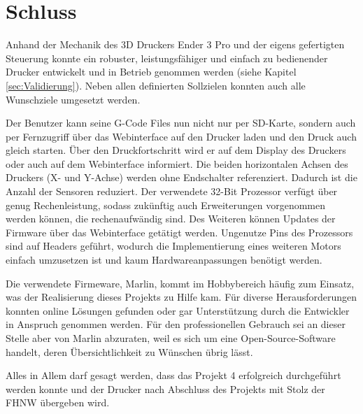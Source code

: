 \section{Schluss}
\label{sec:Schluss}

Anhand der Mechanik des 3D Druckers Ender 3 Pro und der eigens gefertigten Steuerung konnte ein robuster, leistungsfähiger und einfach zu bedienender Drucker entwickelt und in Betrieb genommen werden (siehe Kapitel \ref{sec:Validierung}). Neben allen definierten Sollzielen konnten auch alle Wunschziele umgesetzt werden.

Der Benutzer kann seine G-Code Files nun nicht nur per SD-Karte, sondern auch per Fernzugriff über das Webinterface auf den Drucker laden und den Druck auch gleich starten. Über den Druckfortschritt wird er auf dem Display des Druckers oder auch auf dem Webinterface informiert. Die beiden horizontalen Achsen des Druckers (X- und Y-Achse) werden ohne Endschalter referenziert. Dadurch ist die Anzahl der  Sensoren reduziert.
Der verwendete 32-Bit Prozessor verfügt über genug Rechenleistung, sodass zukünftig auch Erweiterungen vorgenommen werden können, die rechenaufwändig sind. Des Weiteren können Updates der Firmware über das Webinterface getätigt werden. Ungenutze Pins des Prozessors sind auf Headers geführt, wodurch die Implementierung eines weiteren Motors einfach umzusetzen ist und kaum Hardwareanpassungen benötigt werden.

Die verwendete Firmeware, Marlin, kommt im Hobbybereich häufig zum Einsatz, was der Realisierung dieses Projekts zu Hilfe kam. Für diverse Herausforderungen konnten online Lösungen gefunden  oder gar Unterstützung durch die Entwickler in Anspruch genommen werden. Für den professionellen Gebrauch sei an dieser Stelle aber von Marlin abzuraten, weil es sich um eine Open-Source-Software handelt, deren Übersichtlichkeit zu Wünschen übrig lässt.

Alles in Allem darf gesagt werden, dass das Projekt 4 erfolgreich durchgeführt werden konnte und der Drucker nach Abschluss des Projekts mit Stolz der FHNW übergeben wird.
